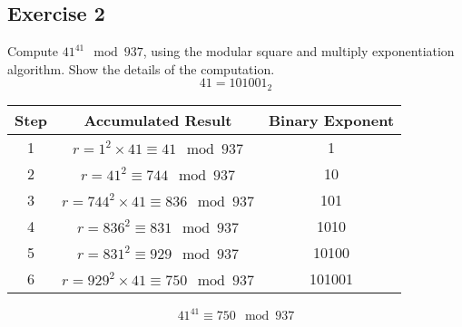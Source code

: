 \documentclass{math}
\begin{document}
\subsection*{Exercise 2}
Compute \( 41^{41}\mod937 \), using the modular square and multiply
exponentiation algorithm. Show the details of the computation.
\[ 41 = 101001_2 \]
\begin{center}
  \begin{tabular}{|c|c|c|}
    \hline
    Step & Accumulated Result & Binary Exponent \\
    \hline
    1 & \( r = 1^2\times41 \equiv 41\mod937 \) & 1 \\
    \hline
    2 & \( r = 41^2 \equiv 744\mod937 \) & 10 \\
    \hline
    3 & \( r = 744^2\times41 \equiv 836\mod937 \) & 101 \\
    \hline
    4 & \( r = 836^2 \equiv 831\mod937 \) & 1010 \\
    \hline
    5 & \( r = 831^2 \equiv 929\mod937 \) & 10100 \\
    \hline
    6 & \( r = 929^2\times41 \equiv 750\mod937 \) & 101001 \\
    \hline
  \end{tabular}
\end{center}
\[ 41^{41} \equiv 750\mod937 \]
\end{document}
